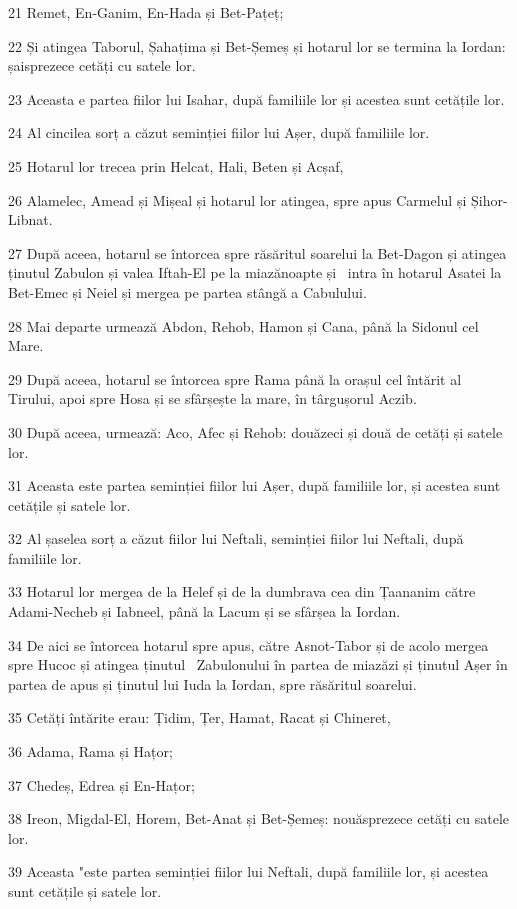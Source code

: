 \par 21 Remet, En-Ganim, En-Hada și Bet-Pațeț;
\par 22 Și atingea Taborul, Șahațima și Bet-Șemeș și hotarul lor se termina la Iordan: șaisprezece cetăți cu satele lor.
\par 23 Aceasta e partea fiilor lui Isahar, după familiile lor și acestea sunt cetățile lor.
\par 24 Al cincilea sorț a căzut seminției fiilor lui Așer, după familiile lor.
\par 25 Hotarul lor trecea prin Helcat, Hali, Beten și Acșaf,
\par 26 Alamelec, Amead și Mișeal și hotarul lor atingea, spre apus Carmelul și Șihor-Libnat.
\par 27 După aceea, hotarul se întorcea spre răsăritul soarelui la Bet-Dagon și atingea ținutul Zabulon și valea Iftah-El pe la miazănoapte și  intra în hotarul Asatei la Bet-Emec și Neiel și mergea pe partea stângă a Cabulului.
\par 28 Mai departe urmează Abdon, Rehob, Hamon și Cana, până la Sidonul cel Mare.
\par 29 După aceea, hotarul se întorcea spre Rama până la orașul cel întărit al Tirului, apoi spre Hosa și se sfârșește la mare, în târgușorul Aczib.
\par 30 După aceea, urmează: Aco, Afec și Rehob: douăzeci și două de cetăți și satele lor.
\par 31 Aceasta este partea seminției fiilor lui Așer, după familiile lor, și acestea sunt cetățile și satele lor.
\par 32 Al șaselea sorț a căzut fiilor lui Neftali, seminției fiilor lui Neftali, după familiile lor.
\par 33 Hotarul lor mergea de la Helef și de la dumbrava cea din Țaananim către Adami-Necheb și Iabneel, până la Lacum și se sfârșea la Iordan.
\par 34 De aici se întorcea hotarul spre apus, către Asnot-Tabor și de acolo mergea spre Hucoc și atingea ținutul  Zabulonului în partea de miazăzi și ținutul Așer în partea de apus și ținutul lui Iuda la Iordan, spre răsăritul soarelui.
\par 35 Cetăți întărite erau: Țidim, Țer, Hamat, Racat și Chineret,
\par 36 Adama, Rama și Hațor;
\par 37 Chedeș, Edrea și En-Hațor;
\par 38 Ireon, Migdal-El, Horem, Bet-Anat și Bet-Șemeș: nouăsprezece cetăți cu satele lor.
\par 39 Aceasta "este partea seminției fiilor lui Neftali, după familiile lor, și acestea sunt cetățile și satele lor.
